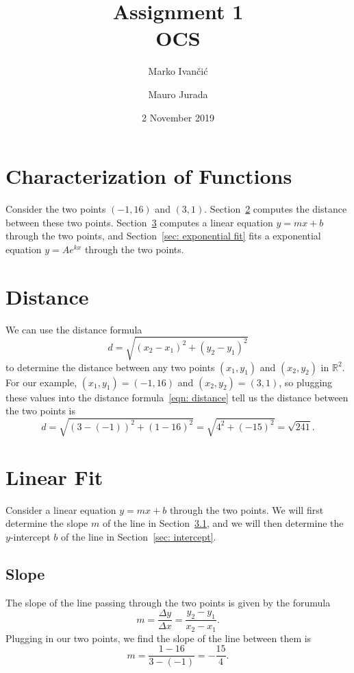\documentclass[10pt]{article}         %
\title{Assignment 1 \\ OCS}
\author{Marko Ivančić \and Mauro Jurada}
\date{2 November 2019}           %
\begin{document}
\maketitle


\section{Characterization of Functions}
Consider the two points $(-1,16)$ and $(3,1)$.  Section~\ref{sec: distance}
computes the distance between these two points.  Section~\ref{sec: linear fit}
computes a linear equation $y = m x + b$ through the two points, and
Section~\ref{sec: exponential fit} fits a exponential equation $y = A e^{k x}$
through the two points.


\section{Distance}
\label{sec: distance}
We can use the distance formula
\begin{equation}
\label{eqn: distance}
	d = \sqrt{(x_2 - x_1)^2 + (y_2 - y_1)^2}
\end{equation}
to determine the distance between any two points $(x_1, y_1)$ and $(x_2, y_2)$
in $\mathbb{R}^2$.  For our example, $(x_1, y_1) = (-1, 16)$ and $(x_2, y_2) =
(3, 1)$, so plugging these values into the distance formula~\eqref{eqn:
distance} tell us the distance between the two points is
$$
	d 
	= \sqrt{(3 - (-1))^2 + (1 - 16)^2}
	= \sqrt{4^2 + (-15)^2}
	= \sqrt{241}
	.
$$

\section{Linear Fit}
\label{sec: linear fit}
Consider a linear equation $y = m x + b$ through the two points.  We will
first determine the slope $m$ of the line in Section~\ref{sec: slope}, and we
will then determine the $y$-intercept $b$ of the line in Section~\ref{sec:
intercept}.

\subsection{Slope}
\label{sec: slope}

The slope of the line passing through the two points is given by the forumula
$$
	m 
	= \frac{\Delta y}{\Delta x} 
	= \frac{y_2 - y_1}{x_2 - x_1}
	.
$$
Plugging in our two points, we find the slope of the line between them is
\begin{equation}
\label{eqn: slope}
	m 
	= \frac{1 - 16}{3 - (-1)}
	= - \frac{15}{4}
	.
\end{equation}
\end{document}
